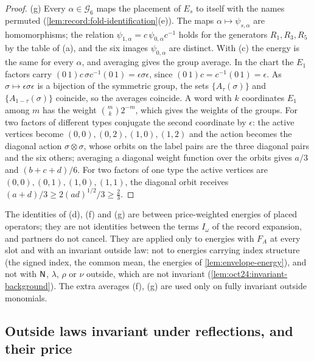 \begin{proof}
(g) Every $\alpha\in\mathcal G_6$ maps the placement of $E_s$ to itself with the names
permuted (\cref{lem:record:fold-identification}(e)). The maps $\alpha\mapsto\psi_{s,\alpha}$ are
homomorphisms; the relation $\psi_{1,\alpha}=c\,\psi_{0,\alpha}c^{-1}$ holds for the
generators $R_1,R_3,R_5$ by the table of (a), and the six images $\psi_{0,\alpha}$ are
distinct. With (c) the energy is the same for every $\alpha$, and averaging gives the
group average. In the chart the $E_1$ factors carry
$(0\,1)c\,\sigma c^{-1}(0\,1)=\epsilon\sigma\epsilon$, since $(0\,1)c=c^{-1}(0\,1)=\epsilon$. As
$\sigma\mapsto\epsilon\sigma\epsilon$ is a bijection of the symmetric group, the sets
$\{A_\tau(\sigma)\}$ and $\{A_{1-\tau}(\sigma)\}$ coincide, so the averages coincide. A
word with $k$ coordinates $E_1$ among $m$ has the weight $\binom mk2^{-m}$, which gives
the weights of the groups. For two factors of different types conjugate the second
coordinate by $\epsilon$: the active vertices become $(0,0),(0,2),(1,0),(1,2)$ and the
action becomes the diagonal action $\sigma\otimes\sigma$, whose orbits on the label pairs
are the three diagonal pairs and the six others; averaging a diagonal weight
function over the orbits gives $a/3$ and $(b+c+d)/6$. For two factors of one type
the active vertices are $(0,0),(0,1),(1,0),(1,1)$, the diagonal orbit receives
$(a+d)/3\ge2(ad)^{1/2}/3\ge\frac23$.
\end{proof}

The identities of (d), (f) and (g) are between price-weighted energies of placed
operators; they are not identities between the terms $I_\omega$ of the record
expansion, and partners do not cancel. They are applied only to energies with $F_A$
at every slot and with an invariant outside law: not to energies carrying index
structure (the signed index, the common mean, the energies of
\cref{lem:envelope-energy}), and not with $\mathsf N$, $\lambda$, $\rho$ or $\nu$ outside,
which are not invariant (\cref{lem:oct24:invariant-background}). The extra averages
(f), (g) are used only on fully invariant outside monomials.

\subsection{Outside laws invariant under reflections, and their price}
\label{subsec:oct24:pure-background}

